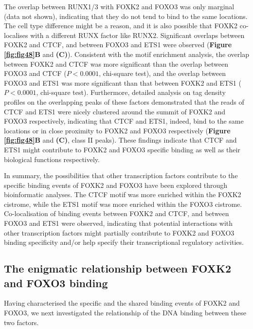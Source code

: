 The overlap between RUNX1/3 with FOXK2 and FOXO3 was only marginal (data not shown), indicating that they do not tend to bind to the same locations. The cell type difference might be a reason, and it is also possible that FOXK2 co-localises with a different RUNX factor like RUNX2. Significant overlaps between FOXK2 and CTCF, and between FOXO3 and ETS1 were observed (\textbf{Figure \ref{fig:fig48}B} and \textbf{(C)}). Consistent with the motif enrichment analysis, the overlap between FOXK2 and CTCF was more significant than the overlap between FOXO3 and CTCF ($P<0.0001$, chi-square test), and the overlap between FOXO3 and ETS1 was more significant than that between FOXK2 and ETS1 ($P<0.0001$, chi-square test). Furthermore, detailed analysis on tag density profiles on the overlapping peaks of these factors demonstrated that the reads of CTCF and ETS1 were nicely clustered around the summit of FOXK2 and FOXO3 respectively, indicating that CTCF and ETS1, indeed, bind to the same locations or in close proximity to FOXK2 and FOXO3 respectively (\textbf{Figure \ref{fig:fig48}B} and \textbf{(C)}, class II peaks). These findings indicate that CTCF and ETS1 might contribute to FOXK2 and FOXO3 specific binding as well as their biological functions respectively.

In summary, the possibilities that other transcription factors contribute to the specific binding events of FOXK2 and FOXO3 have been explored through bioinformatic analyses. The CTCF motif was more enriched within the FOXK2 cistrome, while the ETS1 motif was more enriched within the FOXO3 cistrome. Co-localisation of binding events between FOXK2 and CTCF, and between FOXO3 and ETS1 were observed, indicating that potential interactions with other transcription factors might partially contribute to FOXK2 and FOXO3 binding specificity and/or help specify their transcriptional regulatory activities.

\subsection{The enigmatic relationship between FOXK2 and FOXO3 binding}

Having characterised the specific and the shared binding events of FOXK2 and FOXO3, we next investigated the relationship of the DNA binding between these two factors.

